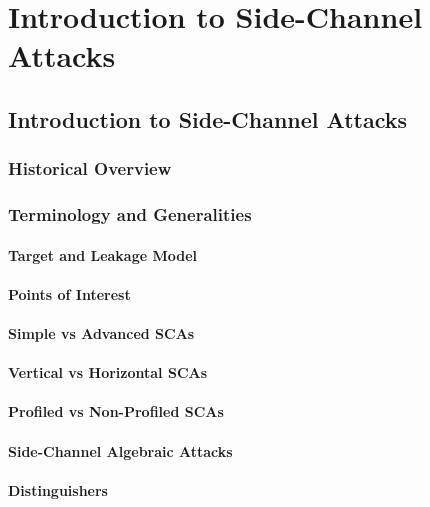 \chapter{Introduction to Side-Channel Attacks} %

\label{ChapterIntroductionSCA}


\section{Introduction to Side-Channel Attacks}
\subsection{Historical Overview}

\subsection{Terminology and Generalities}
\subsubsection{Target and Leakage Model}
\subsubsection{Points of Interest}
\subsubsection{Simple vs Advanced SCAs}
\subsubsection{Vertical vs Horizontal SCAs}
\subsubsection{Profiled vs Non-Profiled SCAs}
\subsubsection{Side-Channel Algebraic Attacks}
\subsubsection{Distinguishers}
